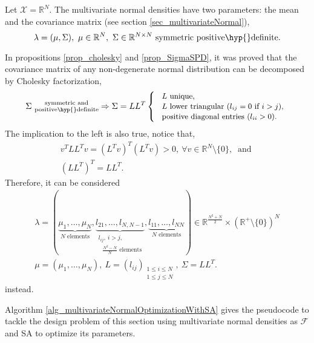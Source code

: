 Let $\mathcal{X} = \mathbb{R}^N$. The multivariate normal densities have two parameters: the mean and the covariance matrix (see section \ref{sec_multivariateNormal}),
$$
  \lambda = (\mu, \Sigma), \ \mu \in \mathbb{R}^N, \ \Sigma \in \mathbb{R}^{N\times N} \ \text{symmetric positive\hyp{}definite.}
$$

In propositions \ref{prop_cholesky} and \ref{prop_SigmaSPD}, it was proved that the covariance matrix of any non-degenerate normal distribution can be decomposed by Cholesky factorization,
$$
  \Sigma \ \substack{\text{symmetric and}\\ \text{positive\hyp{}definite}} \Rightarrow \Sigma = LL^T 
  \left\{ \begin{array}{l}
    \text{ \small $L$ unique, } \\
    \text{ \small $L$ lower triangular ($l_{ij} = 0$ if $i>j$),} \\
    \text{ \small positive diagonal entries ($l_{ii} > 0$).}
  \end{array} \right.
$$
The implication to the left is also true, notice that,
$$
 \begin{array}{c}
  v^TLL^Tv = (L^Tv)^T(L^Tv) > 0, \ \forall v\in\mathbb{R}^N\setminus\{0\}, \ \text{ and } \\
  (LL^T)^T = LL^T.
 \end{array}
$$
Therefore, it can be considered
\begin{equation} \label{eq_lambdaToMuSigma}
 \begin{array}{c}
  \lambda = ( 
        \underbrace{\mu_1,\dots,\mu_N}_{N \text{ elements}},
        \underbrace{l_{21},\dots,l_{N,N-1}}_{\substack{l_{ij}, \ i>j, \\ \text{ $\frac{N^2-N}{N}$ elements}}},
        \underbrace{l_{11},\dots,l_{NN}}_{N \text{ elements}}
        ) \in \mathbb{R}^{\frac{N^2+N}{2}} \times (\mathbb{R}^+\setminus\{0\})^N \\
  \mu = (\mu_1, \dots, \mu_N), \ L = (l_{ij})_{\substack{1\leq i\leq N \\ 1\leq j\leq N}}, \ \Sigma = LL^T.
 \end{array}
\end{equation}
instead.

Algorithm \ref{alg_multivariateNormalOptimizationWithSA} gives the pseudocode to tackle the design problem of this section using multivariate normal densities as $\mathcal{F}$ and SA to optimize its parameters.

